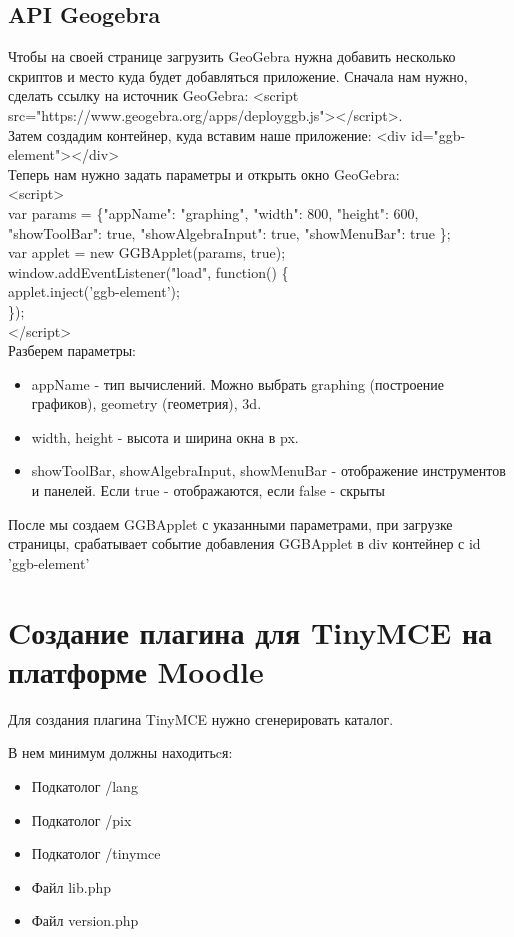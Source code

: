 \documentclass[14pt,Diplom]{diplomwork}
\begin{document}
\subsection{API Geogebra}
Чтобы на своей странице загрузить GeoGebra нужна добавить несколько скриптов и место куда будет добавляться приложение. Сначала нам нужно, сделать ссылку на источник GeoGebra: <script src="https://www.geogebra.org/apps/deployggb.js"></script>.\\
Затем создадим контейнер, куда вставим наше приложение: <div id="ggb-element"></div> \\
Теперь нам нужно задать параметры и открыть окно GeoGebra: \\
<script> \\
	var params = \{"appName": "graphing", "width": 800, "height": 600, "showToolBar": true, "showAlgebraInput": true, "showMenuBar": true \};\\
	var applet = new GGBApplet(params, true);\\
	window.addEventListener("load", function() \{ \\
		applet.inject('ggb-element');\\
\});\\
</script>\\
Разберем параметры:

\begin{itemize}
	\item appName - тип вычислений. Можно выбрать graphing (построение графиков), geometry (геометрия), 3d.
	\item width, height - высота и ширина окна в px.
	\item showToolBar, showAlgebraInput, showMenuBar - отображение инструментов и панелей. Если true - отображаются, если false - скрыты
\end{itemize}

После мы создаем GGBApplet с указанными параметрами, при загрузке страницы, срабатывает событие добавления GGBApplet в div контейнер с id 'ggb-element'



\section{Cоздание плагина для TinyMCE на платформе Moodle}
Для создания плагина TinyMCE нужно сгенерировать каталог.

В нем минимум должны находитьcя:

\begin{itemize}
	\item Подкатолог /lang
	\item Подкатолог /pix
	\item Подкатолог /tinymce
	\item Файл lib.php
	\item Файл version.php
\end{itemize}
\end{document}
